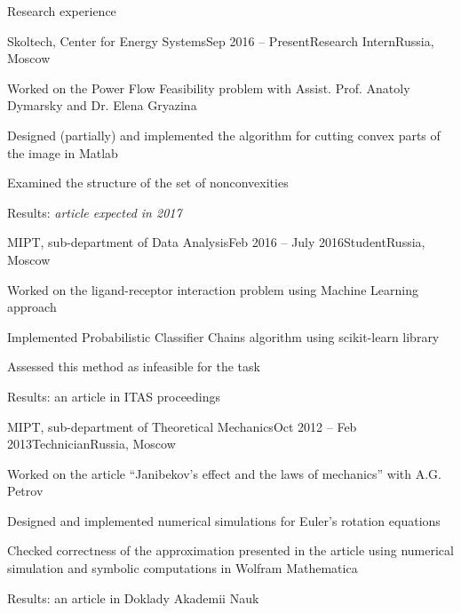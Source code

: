 \documentclass{resume} %
\begin{document}
\begin{rSection}{Research experience}
	\begin{rSubsection}{Skoltech, Center for Energy Systems}{Sep 2016 -- Present}{Research Intern}{Russia, Moscow}
		\item Worked on the Power Flow Feasibility problem with Assist. Prof. Anatoly Dymarsky and Dr. Elena Gryazina
		\item Designed (partially) and implemented the algorithm for cutting convex parts of the image in Matlab
		\item Examined the structure of the set of nonconvexities
		\item Results: \em article expected in 2017
	\end{rSubsection}
	
	\begin{rSubsection}{MIPT, sub-department of Data Analysis}{Feb 2016 -- July 2016}{Student}{Russia, Moscow}
		\item Worked on the ligand-receptor interaction problem using Machine Learning approach
		\item Implemented Probabilistic Classifier Chains algorithm using scikit-learn library
		\item Assessed this method as infeasible for the task
		\item Results: an article in ITAS proceedings
	\end{rSubsection}
	
	\begin{rSubsection}{MIPT, sub-department of Theoretical Mechanics}{Oct 2012 -- Feb 2013}{Technician}{Russia, Moscow}
		\item Worked on the article ``Janibekov's effect and the laws of mechanics'' with A.G. Petrov
		\item Designed and implemented numerical simulations for Euler's rotation equations
		\item Checked correctness of the approximation presented in the article using numerical simulation and symbolic computations in Wolfram Mathematica
		\item Results: an article in Doklady Akademii Nauk
	\end{rSubsection}
\end{rSection}

\end{document}

